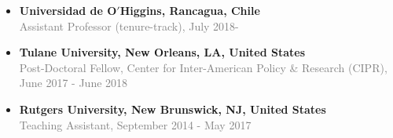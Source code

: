 \begin{itemize}
  \item[\textcolor{gray}{\textbullet}] {\bf Universidad de O$'$Higgins, Rancagua, Chile}\\
  \textcolor{gray}{Assistant Professor (tenure-track), July 2018-}

  \item[\textcolor{gray}{\textbullet}] {\bf Tulane University, New Orleans, LA, United States}\\
  \textcolor{gray}{Post-Doctoral Fellow, Center for Inter-American Policy \& Research (CIPR), June 2017 - June 2018}

  \item[\textcolor{gray}{\textbullet}] {\bf Rutgers University, New Brunswick, NJ, United States}\\
 \textcolor{gray}{Teaching Assistant, September 2014 - May 2017}
\end{itemize}
